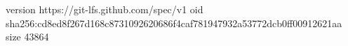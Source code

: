 version https://git-lfs.github.com/spec/v1
oid sha256:cd8ed8f267d168c8731092620686f4caf781947932a53772dcb0ff00912621aa
size 43864
